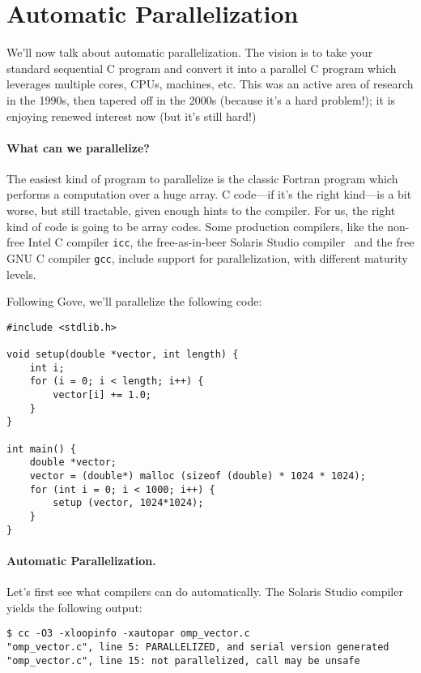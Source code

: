 




\section*{Automatic Parallelization}

We'll now talk about automatic parallelization. The vision is to take
your standard sequential C program and convert it into a parallel C
program which leverages multiple cores, CPUs, machines, etc.  This was
an active area of research in the 1990s, then tapered off in the 2000s
(because it's a hard problem!); it is enjoying renewed interest now (but
it's still hard!)

\paragraph{What can we parallelize?} The
easiest kind of program to parallelize is the classic Fortran program
which performs a computation over a huge array. C code---if it's the
right kind---is a bit worse, but still tractable, given enough hints
to the compiler. For us, the right kind of code is going to be array
codes. Some production compilers, like the non-free Intel C compiler
{\tt icc}, the free-as-in-beer Solaris Studio
compiler~\cite{solarisstudio}
and the free GNU C compiler {\tt gcc}, include support for
parallelization, with different maturity levels.


Following Gove, we'll parallelize the following code:

\begin{verbatim}
#include <stdlib.h>

void setup(double *vector, int length) {
    int i;
    for (i = 0; i < length; i++) {
        vector[i] += 1.0;
    }
}

int main() {
    double *vector;
    vector = (double*) malloc (sizeof (double) * 1024 * 1024);
    for (int i = 0; i < 1000; i++) {
        setup (vector, 1024*1024);
    }
}
\end{verbatim}


\paragraph{Automatic Parallelization.} Let's first see what compilers can do automatically.
The Solaris Studio compiler yields the following output:
{\small 
\begin{verbatim}
$ cc -O3 -xloopinfo -xautopar omp_vector.c 
"omp_vector.c", line 5: PARALLELIZED, and serial version generated
"omp_vector.c", line 15: not parallelized, call may be unsafe
\end{verbatim}
} 


